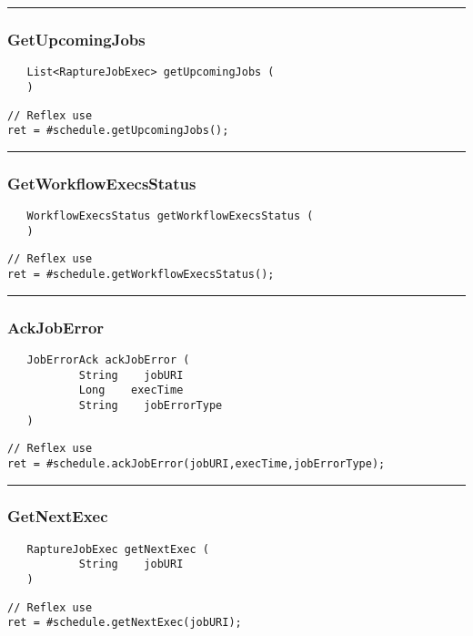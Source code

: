 \rule{15cm}{2pt}
\subsubsection{GetUpcomingJobs}
\label{Api:GetUpcomingJobs}
\begin{verbatim}
   List<RaptureJobExec> getUpcomingJobs (
   )
\end{verbatim}
\begin{lstlisting}[language=reflex]
// Reflex use
ret = #schedule.getUpcomingJobs();
\end{lstlisting}



\rule{15cm}{2pt}
\subsubsection{GetWorkflowExecsStatus}
\label{Api:GetWorkflowExecsStatus}
\begin{verbatim}
   WorkflowExecsStatus getWorkflowExecsStatus (
   )
\end{verbatim}
\begin{lstlisting}[language=reflex]
// Reflex use
ret = #schedule.getWorkflowExecsStatus();
\end{lstlisting}



\rule{15cm}{2pt}
\subsubsection{AckJobError}
\label{Api:AckJobError}
\begin{verbatim}
   JobErrorAck ackJobError (
           String    jobURI
           Long    execTime
           String    jobErrorType
   )
\end{verbatim}
\begin{lstlisting}[language=reflex]
// Reflex use
ret = #schedule.ackJobError(jobURI,execTime,jobErrorType);
\end{lstlisting}



\rule{15cm}{2pt}
\subsubsection{GetNextExec}
\label{Api:GetNextExec}
\begin{verbatim}
   RaptureJobExec getNextExec (
           String    jobURI
   )
\end{verbatim}
\begin{lstlisting}[language=reflex]
// Reflex use
ret = #schedule.getNextExec(jobURI);
\end{lstlisting}




